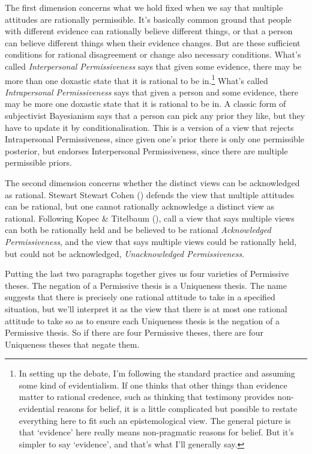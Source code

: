 \documentclass[
  12pt,
  letterpaper,
  DIV=11,
  numbers=noendperiod]{scrreprt}
\begin{document}
The first dimension concerns what we hold fixed when we say that
multiple attitudes are rationally permissible. It's basically common
ground that people with different evidence can rationally believe
different things, or that a person can believe different things when
their evidence changes. But are these sufficient conditions for rational
disagreement or change also necessary conditions. What's called
\emph{Interpersonal Permissiveness} says that given some evidence, there
may be more than one doxastic state that it is rational to be
in.\footnote{In setting up the debate, I'm following the standard
  practice and assuming some kind of evidentialism. If one thinks that
  other things than evidence matter to rational credence, such as
  thinking that testimony provides non-evidential reasons for belief, it
  is a little complicated but possible to restate everything here to fit
  such an epistemological view. The general picture is that `evidence'
  here really means non-pragmatic reasons for belief. But it's simpler
  to say `evidence', and that's what I'll generally say.} What's called
\emph{Intrapersonal Permissiveness} says that given a person and some
evidence, there may be more one doxastic state that it is rational to be
in. A classic form of subjectivist Bayesianism says that a person can
pick any prior they like, but they have to update it by
conditionalisation. This is a version of a view that rejects
Intrapersonal Permissiveness, since given one's prior there is only one
permissible posterior, but endorses Interpersonal Permissiveness, since
there are multiple permissible priors.

The second dimension concerns whether the distinct views can be
acknowledged as rational. Stewart Stewart Cohen
() defends the view that multiple
attitudes can be rational, but one cannot rationally acknowledge a
distinct view as rational. Following Kopec \& Titelbaum
(), call a view that says
multiple views can both be rationally held and be believed to be
rational \emph{Acknowledged Permissiveness}, and the view that says
multiple views could be rationally held, but could not be acknowledged,
\emph{Unacknowledged Permissiveness}.

Putting the last two paragraphs together gives us four varieties of
Permissive theses. The negation of a Permissive thesis is a Uniqueness
thesis. The name suggests that there is precisely one rational attitude
to take in a specified situation, but we'll interpret it as the view
that there is at most one rational attitude to take so as to ensure each
Uniqueness thesis is the negation of a Permissive thesis. So if there
are four Permissive theses, there are four Uniqueness theses that negate
them.
\end{document}
